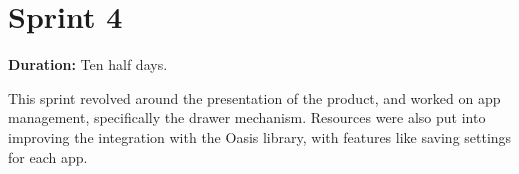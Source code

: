 \section*{Sprint 4}%

\textbf{Duration:} Ten half days. \newline

This sprint revolved around the presentation of the product, and worked on app management, specifically the drawer mechanism. 
Resources were also put into improving the integration with the Oasis library, with features like saving settings for each app. 